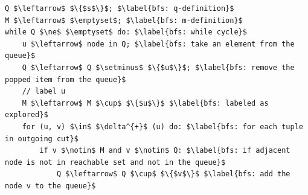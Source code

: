 \begin{lstlisting}[language=pseudo-code, caption={Graph reachability problem: Breadth-First Search}]
Q $\leftarrow$ $\{$s$\}$; $\label{bfs: q-definition}$
M $\leftarrow$ $\emptyset$; $\label{bfs: m-definition}$
while Q $\ne$ $\emptyset$ do: $\label{bfs: while cycle}$
    u $\leftarrow$ node in Q; $\label{bfs: take an element from the queue}$
    Q $\leftarrow$ Q $\setminus$ $\{$u$\}$; $\label{bfs: remove the popped item from the queue}$
    // label u
    M $\leftarrow$ M $\cup$ $\{$u$\}$ $\label{bfs: labeled as explored}$
    for (u, v) $\in$ $\delta^{+}$ (u) do: $\label{bfs: for each tuple in outgoing cut}$
        if v $\notin$ M and v $\notin$ Q: $\label{bfs: if adjacent node is not in reachable set and not in the queue}$
            Q $\leftarrow$ Q $\cup$ $\{$v$\}$ $\label{bfs: add the node v to the queue}$
\end{lstlisting}

